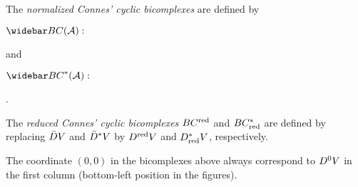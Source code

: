 \documentclass[\MainFolder/Text.tex]{subfiles}
\begin{document}
\begin{Definition}
\begin{equation}
\end{equation}
The \emph{normalized Connes' cyclic bicomplexes} are defined by
\begin{center}
$\NConCycBi(\mathcal{A}):$
\end{center}
and
\begin{center}
$\NConCycBi^*(\mathcal{A}):$
.
\end{center}
The \emph{reduced Connes' cyclic bicomplexes} $BC^{\mathrm{red}}$ and $BC_{\mathrm{red}}^*$ are defined by replacing $\bar{D} V$ and $\bar{D}^*V$ by $D^{\mathrm{red}} V$ and $D_{\mathrm{red}}^* V$, respectively.

The coordinate $(0,0)$ in the bicomplexes above always correspond to $D^0 V$ in the first column (bottom-left position in the figures). 
\end{Definition}
%
\end{document}

